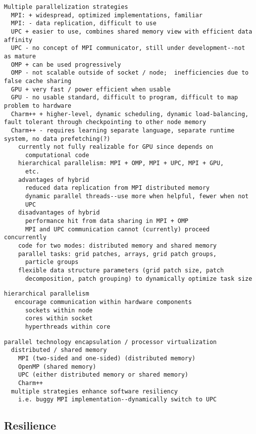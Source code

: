 \documentclass[10pt]{article}
\begin{document}
\begin{verbatim}
Multiple parallelization strategies
  MPI: + widespread, optimized implementations, familiar
  MPI: - data replication, difficult to use
  UPC + easier to use, combines shared memory view with efficient data affinity
  UPC - no concept of MPI communicator, still under development--not as mature
  OMP + can be used progressively
  OMP - not scalable outside of socket / node;  inefficiencies due to false cache sharing
  GPU + very fast / power efficient when usable
  GPU - no usable standard, difficult to program, difficult to map problem to hardware
  Charm++ + higher-level, dynamic scheduling, dynamic load-balancing, fault tolerant through checkpointing to other node memory
  Charm++ - requires learning separate language, separate runtime system, no data prefetching(?)
    currently not fully realizable for GPU since depends on
      computational code
    hierarchical parallelism: MPI + OMP, MPI + UPC, MPI + GPU,
      etc.
    advantages of hybrid
      reduced data replication from MPI distributed memory
      dynamic parallel threads--use more when helpful, fewer when not
      UPC
    disadvantages of hybrid
      performance hit from data sharing in MPI + OMP
      MPI and UPC communication cannot (currently) proceed concurrently
    code for two modes: distributed memory and shared memory
    parallel tasks: grid patches, arrays, grid patch groups,
      particle groups
    flexible data structure parameters (grid patch size, patch
      decomposition, patch grouping) to dynamically optimize task size
\end{verbatim}

\begin{verbatim}
hierarchical parallelism
   encourage communication within hardware components
      sockets within node
      cores within socket
      hyperthreads within core
\end{verbatim}

\begin{verbatim}
parallel technology encapsulation / processor virtualization
  distributed / shared memory
    MPI (two-sided and one-sided) (distributed memory)
    OpenMP (shared memory) 
    UPC (either distributed memory or shared memory)
    Charm++
  multiple strategies enhance software resiliency
    i.e. buggy MPI implementation--dynamically switch to UPC
\end{verbatim}

\subsection{Resilience} \label{ss:design-resilience}
\end{document}
